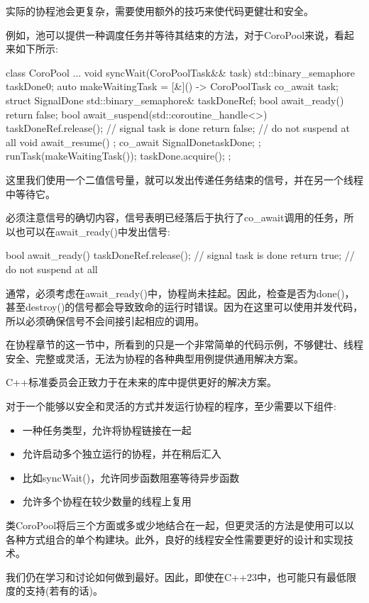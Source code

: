 
实际的协程池会更复杂，需要使用额外的技巧来使代码更健壮和安全。

例如，池可以提供一种调度任务并等待其结束的方法，对于CoroPool来说，看起来如下所示:

\begin{cpp}
class CoroPool
{
	...
	void syncWait(CoroPoolTask&& task) {
		std::binary_semaphore taskDone{0};
		auto makeWaitingTask = [&]() -> CoroPoolTask {
			co_await task;
			struct SignalDone {
				std::binary_semaphore& taskDoneRef;
				bool await_ready() { return false; }
				bool await_suspend(std::coroutine_handle<>) {
					taskDoneRef.release(); // signal task is done
					return false; // do not suspend at all
				}
				void await_resume() { }
			};
			co_await SignalDone{taskDone};
		};
		runTask(makeWaitingTask());
		taskDone.acquire();
	}
};
\end{cpp}

这里我们使用一个二值信号量，就可以发出传递任务结束的信号，并在另一个线程中等待它。

必须注意信号的确切内容，信号表明已经落后于执行了co\_await调用的任务，所以也可以在await\_ready()中发出信号:

\begin{cpp}
bool await_ready() {
	taskDoneRef.release(); // signal task is done
	return true; // do not suspend at all
}
\end{cpp}

通常，必须考虑在await\_ready()中，协程尚未挂起。因此，检查是否为done()，甚至destroy()的信号都会导致致命的运行时错误。因为在这里可以使用并发代码，所以必须确保信号不会间接引起相应的调用。


在协程章节的这一节中，所看到的只是一个非常简单的代码示例，不够健壮、线程安全、完整或灵活，无法为协程的各种典型用例提供通用解决方案。

C++标准委员会正致力于在未来的库中提供更好的解决方案。

对于一个能够以安全和灵活的方式并发运行协程的程序，至少需要以下组件:

\begin{itemize}
\item
一种任务类型，允许将协程链接在一起

\item
允许启动多个独立运行的协程，并在稍后汇入

\item
比如syncWait()，允许同步函数阻塞等待异步函数

\item
允许多个协程在较少数量的线程上复用
\end{itemize}

类CoroPool将后三个方面或多或少地结合在一起，但更灵活的方法是使用可以以各种方式组合的单个构建块。此外，良好的线程安全性需要更好的设计和实现技术。

我们仍在学习和讨论如何做到最好。因此，即使在C++23中，也可能只有最低限度的支持(若有的话)。



